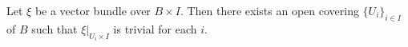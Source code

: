 Let $\xi$ be a vector bundle over $B \times I$. Then there exists an open covering $\{U_i\}_{i \in I}$ of $B$ such that $\xi|_{U_i \times I}$ is trivial for each $i$.
